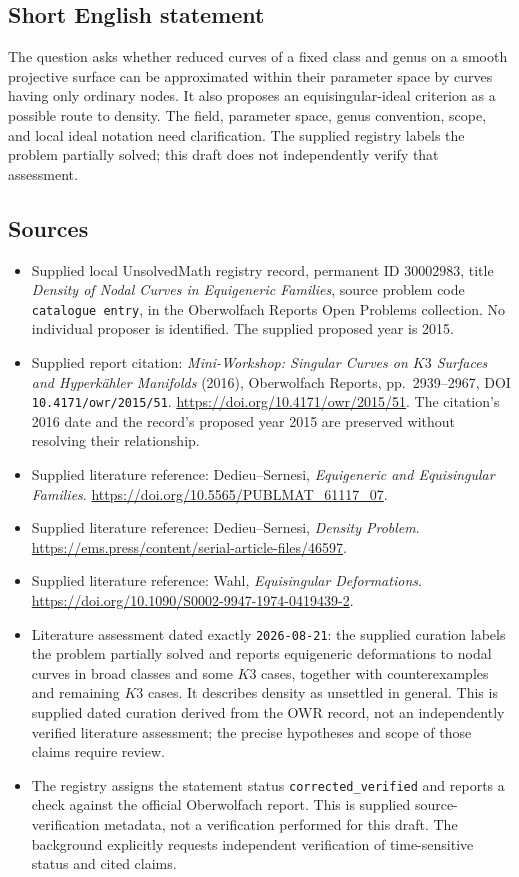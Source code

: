 \documentclass[11pt]{article}
\begin{document}
\subsection{Short English statement}
The question asks whether reduced curves of a fixed class and genus on a smooth projective surface can be approximated within their parameter space by curves having only ordinary nodes. It also proposes an equisingular-ideal criterion as a possible route to density. The field, parameter space, genus convention, scope, and local ideal notation need clarification. The supplied registry labels the problem partially solved; this draft does not independently verify that assessment.
\subsection{Sources}
\begin{itemize}
\item Supplied local UnsolvedMath registry record, permanent ID \(30002983\), title \emph{Density of Nodal Curves in Equigeneric Families}, source problem code \texttt{catalogue entry}, in the Oberwolfach Reports Open Problems collection. No individual proposer is identified. The supplied proposed year is 2015.
\item Supplied report citation: \emph{Mini-Workshop: Singular Curves on \(K3\) Surfaces and Hyperkähler Manifolds} (2016), Oberwolfach Reports, pp.\ 2939--2967, DOI \texttt{10.4171/owr/2015/51}. \url{https://doi.org/10.4171/owr/2015/51}. The citation's 2016 date and the record's proposed year 2015 are preserved without resolving their relationship.
\item Supplied literature reference: Dedieu--Sernesi, \emph{Equigeneric and Equisingular Families}. \url{https://doi.org/10.5565/PUBLMAT_61117_07}.
\item Supplied literature reference: Dedieu--Sernesi, \emph{Density Problem}. \url{https://ems.press/content/serial-article-files/46597}.
\item Supplied literature reference: Wahl, \emph{Equisingular Deformations}. \url{https://doi.org/10.1090/S0002-9947-1974-0419439-2}.
\item Literature assessment dated exactly \texttt{2026-08-21}: the supplied curation labels the problem partially solved and reports equigeneric deformations to nodal curves in broad classes and some \(K3\) cases, together with counterexamples and remaining \(K3\) cases. It describes density as unsettled in general. This is supplied dated curation derived from the OWR record, not an independently verified literature assessment; the precise hypotheses and scope of those claims require review.
\item The registry assigns the statement status \texttt{corrected\_verified} and reports a check against the official Oberwolfach report. This is supplied source-verification metadata, not a verification performed for this draft. The background explicitly requests independent verification of time-sensitive status and cited claims.
\end{itemize}
\end{document}
